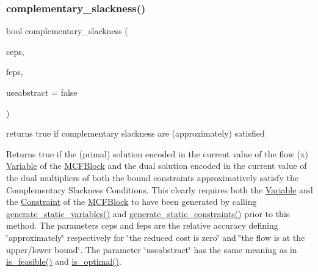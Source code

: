 \subsubsection{\texorpdfstring{complementary\+\_\+slackness()}{complementary\_slackness()}}
{\footnotesize\ttfamily bool complementary\+\_\+slackness (\begin{DoxyParamCaption}\item[{\mbox{\hyperlink{class_s_m_spp__di__unipi__it_1_1_m_c_f_block_a8e47cae4e16e180273d262aae769a854}{c\+\_\+\+C\+Number}}}]{ceps,  }\item[{\mbox{\hyperlink{class_s_m_spp__di__unipi__it_1_1_m_c_f_block_a956c123a5a6b2b52f033ca1987acd80e}{c\+\_\+\+F\+Number}}}]{feps,  }\item[{bool}]{useabstract = {\ttfamily false} }\end{DoxyParamCaption})}



returns true if complementary slackness are (approximately) satisfied 

Returns true if the (primal) solution encoded in the current value of the flow (x) \mbox{\hyperlink{class_s_m_spp__di__unipi__it_1_1_variable}{Variable}} of the \mbox{\hyperlink{class_s_m_spp__di__unipi__it_1_1_m_c_f_block}{M\+C\+F\+Block}} and the dual solution encoded in the current value of the dual multipliers of both the bound constraints approximatively satisfy the Complementary Slackness Conditions. This clearly requires both the \mbox{\hyperlink{class_s_m_spp__di__unipi__it_1_1_variable}{Variable}} and the \mbox{\hyperlink{class_s_m_spp__di__unipi__it_1_1_constraint}{Constraint}} of the \mbox{\hyperlink{class_s_m_spp__di__unipi__it_1_1_m_c_f_block}{M\+C\+F\+Block}} to have been generated by calling \mbox{\hyperlink{class_s_m_spp__di__unipi__it_1_1_m_c_f_block_a599bd50cdc6123555aa4a6c4e22c996d}{generate\+\_\+static\+\_\+variables()}} and \mbox{\hyperlink{class_s_m_spp__di__unipi__it_1_1_m_c_f_block_a33f94035590874ef8616982e11e7bb43}{generate\+\_\+static\+\_\+constraints()}} prior to this method. The parameters ceps and feps are the relative accuracy defining \char`\"{}approximately\char`\"{} respectively for \char`\"{}the reduced cost is zero\char`\"{} and \char`\"{}the flow is at the upper/lower bound\char`\"{}. The parameter \char`\"{}useabstract\char`\"{} has the same meaning as in \mbox{\hyperlink{class_s_m_spp__di__unipi__it_1_1_m_c_f_block_a162cd7d8375d705f0b15d8e847098763}{is\+\_\+feasible()}} and \mbox{\hyperlink{class_s_m_spp__di__unipi__it_1_1_m_c_f_block_a0b1e7ff87a97e692c97f52f096f6eb50}{is\+\_\+optimal()}}. \mbox{\label{class_s_m_spp__di__unipi__it_1_1_m_c_f_block_a817e3ce47ea40c14517ec16c6b62b814}} 
